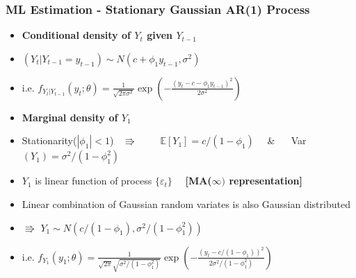 \documentclass{beamer}
\begin{document}
		\begin{frame}
		\frametitle{ML Estimation - Stationary Gaussian AR(1) Process}
		\begin{itemize}
			
			\item[] \textbf{Conditional density of $Y_t$ given $Y_{t-1}$}
	\vspace{6pt} 
	\item[] \hspace{35pt} $(Y_{t}|Y_{t-1}=y_{t-1}) \sim N(c+\phi_{1}y_{t-1}, \sigma^2)$
	\pause	\vspace{16pt} 
	\item[] \hspace{45pt} i.e. $f_{Y_t|Y_{t-1}}(y_t ; \theta)=\frac{1}{\sqrt{2\pi\sigma^2}} \exp\left(-\frac{(y_t-c-\phi_1 y_{t-1})^2}{2\sigma^2}\right)$


	\pause	\vspace{20pt} 
		\pause	\vspace{16pt} 
	\item[] \textbf{Marginal density of $Y_1$}
		\vspace{6pt} 
		\item[] \hspace{35pt} Stationarity($|\phi_1|<1$) $\;\;\Rrightarrow\qquad$  $\mathbb{E}[Y_1]=c/(1-\phi_{1}) \quad$ \& $\quad$ Var$(Y_1)=\sigma^2/(1-\phi_{1}^2)$
					\pause	\vspace{10pt} 
		\item[] \hspace{35pt}  $Y_1$ is linear function of process $\{\varepsilon_t\}\quad$ \textbf{[MA($\infty)$ representation]}
				\pause	\vspace{10pt} 
	\item[] \hspace{35pt}  Linear combination of Gaussian random variates is also Gaussian distributed
			\pause	\vspace{10pt} 
	\item[] \hspace{45pt}  $\Rrightarrow$ $Y_1\sim N(c/(1-\phi_1), \sigma^2/(1-\phi_{1}^2))$
				\pause	\vspace{10pt} 
	\item[] \hspace{55pt} i.e. $f_{Y_1}(y_1 ; \theta)=\frac{1}{\sqrt{2\pi}\sqrt{\sigma^2/(1-\phi_1^2)}}
 \exp\left(-\frac{(y_t-c/(1-\phi_1))^2}{2\sigma^2/(1-\phi_1^2)}\right)$
\end{itemize}
\end{frame}
\end{document}
